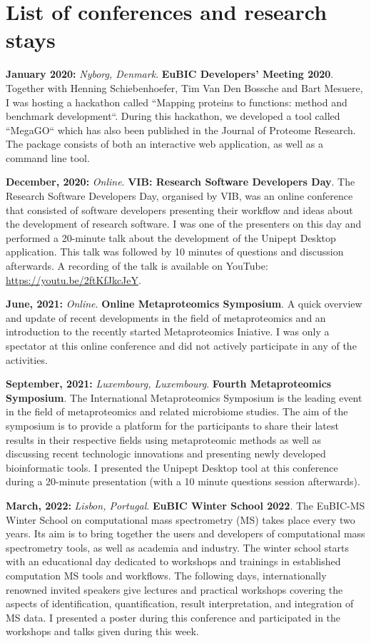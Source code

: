 \chapter*{List of conferences and research stays}

\textbf{January 2020:} \textit{Nyborg, Denmark}. \textbf{EuBIC Developers' Meeting 2020}.
Together with Henning Schiebenhoefer, Tim Van Den Bossche and Bart Mesuere, I was hosting a hackathon called ``Mapping proteins to functions: method and benchmark development``.
During this hackathon, we developed a tool called ``MegaGO`` which has also been published in the Journal of Proteome Research. The package consists of both an interactive web application, as well as a command line tool.

\textbf{December, 2020:} \textit{Online}. \textbf{VIB: Research Software Developers Day}.
The Research Software Developers Day, organised by VIB, was an online conference that consisted of software developers presenting their workflow and ideas about the development of research software.
I was one of the presenters on this day and performed a 20-minute talk about the development of the Unipept Desktop application. This talk was followed by 10 minutes of questions and discussion afterwards.
A recording of the talk is available on YouTube: \href{https://youtu.be/2ftKfJkcJeY}{https://youtu.be/2ftKfJkcJeY}.

\textbf{June, 2021:} \textit{Online}. \textbf{Online Metaproteomics Symposium}.
A quick overview and update of recent developments in the field of metaproteomics and an introduction to the recently started Metaproteomics Iniative.
I was only a spectator at this online conference and did not actively participate in any of the activities.

\textbf{September, 2021:} \textit{Luxembourg, Luxembourg}. \textbf{Fourth Metaproteomics Symposium}. The International Metaproteomics Symposium is the leading event in the field of metaproteomics and related microbiome studies.
The aim of the symposium is to provide a platform for the participants to share their latest results in their respective fields using metaproteomic methods as well as discussing recent technologic innovations and presenting newly developed bioinformatic tools.
I presented the Unipept Desktop tool at this conference during a 20-minute presentation (with a 10 minute questions session afterwards).

\textbf{March, 2022:} \textit{Lisbon, Portugal}. \textbf{EuBIC Winter School 2022}. The EuBIC-MS Winter School on computational mass spectrometry (MS) takes place every two years.
Its aim is to bring together the users and developers of computational mass spectrometry tools, as well as academia and industry.
The winter school starts with an educational day dedicated to workshops and trainings in established computation MS tools and workflows.
The following days, internationally renowned invited speakers give lectures and practical workshops covering the aspects of identification, quantification, result interpretation, and integration of MS data.
I presented a poster during this conference and participated in the workshops and talks given during this week.

